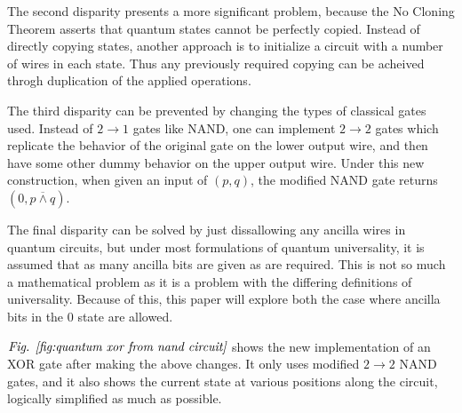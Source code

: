\documentclass[12pt]{article}
\newcommand{\nand}{\overline{\land}}
\begin{document}
The second disparity presents a more significant problem, because the No Cloning Theorem asserts that quantum states cannot be perfectly copied. Instead of directly copying states, another approach is to initialize a circuit with a number of wires in each state. Thus any previously required copying can be acheived throgh duplication of the applied operations.

The third disparity can be prevented by changing the types of classical gates used. Instead of $2 \to 1$ gates like NAND, one can implement $2 \to 2$ gates which replicate the behavior of the original gate on the lower output wire, and then have some other dummy behavior on the upper output wire. Under this new construction, when given an input of $(p, q)$, the modified NAND gate returns $(0, p \nand q)$.

The final disparity can be solved by just dissallowing any ancilla wires in quantum circuits, but under most formulations of quantum universality, it is assumed that as many ancilla bits are given as are required. This is not so much a mathematical problem as it is a problem with the differing definitions of universality. Because of this, this paper will explore both the case where ancilla bits in the 0 state are allowed.

$\emph{Fig. \ref{fig:quantum xor from nand circuit}}$ shows the new implementation of an XOR gate after making the above changes. It only uses modified $2 \to 2$ NAND gates, and it also shows the current state at various positions along the circuit, logically simplified as much as possible.
\end{document}
